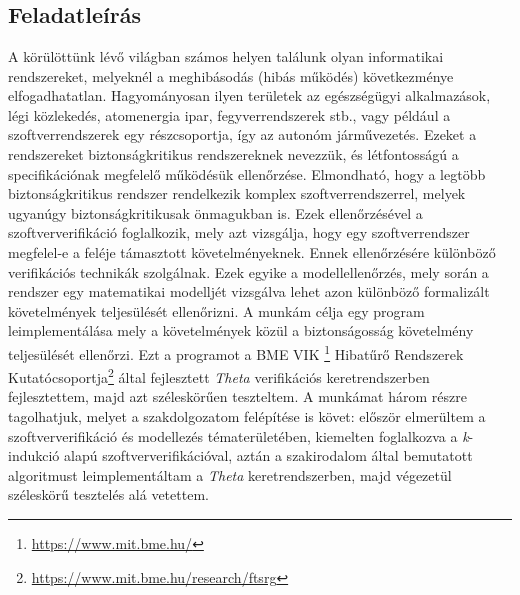 \chapter{\bevezetes}

\section{Feladatleírás}

A körülöttünk lévő világban számos helyen találunk olyan informatikai rendszereket, melyeknél a meghibásodás (hibás működés) következménye elfogadhatatlan. Hagyományosan ilyen területek az egészségügyi alkalmazások, légi közlekedés, atomenergia ipar, fegyverrendszerek stb., vagy például a szoftverrendszerek egy részcsoportja, így az autonóm járművezetés. Ezeket a rendszereket biztonságkritikus rendszereknek nevezzük, és létfontosságú a specifikációnak megfelelő működésük ellenőrzése.
\newline
\newline
Elmondható, hogy a legtöbb biztonságkritikus rendszer rendelkezik komplex szoftverrendszerrel, melyek ugyanúgy biztonságkritikusak önmagukban is. Ezek ellenőrzésével a szoftververifikáció foglalkozik, mely azt vizsgálja, hogy egy szoftverrendszer megfelel-e a feléje támasztott követelményeknek. 
\newline
\newline
Ennek ellenőrzésére különböző verifikációs technikák szolgálnak. Ezek egyike a modellellenőrzés, mely során a rendszer egy matematikai modelljét vizsgálva lehet azon különböző formalizált követelmények teljesülését ellenőrizni.
\newline
\newline
A munkám célja egy program leimplementálása mely a követelmények közül a biztonságosság követelmény teljesülését ellenőrzi. Ezt a programot a BME VIK \bmemit\footnote{\url{https://www.mit.bme.hu/}} Hibatűrő Rendszerek Kutatócsoportja\footnote{\url{https://www.mit.bme.hu/research/ftsrg}} által fejlesztett \emph{Theta} \cite{theta-fmcad2017} verifikációs keretrendszerben fejlesztettem, majd azt széleskörűen teszteltem.
\newline
\newline
A munkámat három részre tagolhatjuk, melyet a szakdolgozatom felépítése is követ: először elmerültem a szoftververifikáció és modellezés tématerületében, kiemelten foglalkozva a \emph{k}-indukció alapú szoftververifikációval, aztán a szakirodalom által bemutatott algoritmust leimplementáltam a \emph{Theta} keretrendszerben, majd végezetül széleskörű tesztelés alá vetettem.

